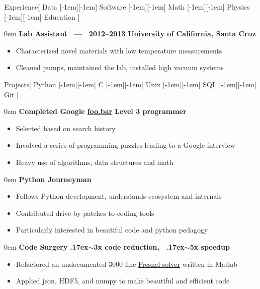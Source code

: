 \documentclass[11pt,a4paper]{article}
\newenvironment{headedsection}[2]{
    \begin{addmargin}[0.5em]{0em}
    {\large\bfseries #1} \hfill {\bfseries #2}%
    \begin{itemize}
        [label={}, topsep=0pt, itemsep=1.5pt, parsep=0pt, leftmargin=1.5em]
}{
    \end{itemize}
    \end{addmargin}
    \medskip
}
\newcommand*\sbull{%
    \raisebox{-0.550ex}[-1em][-1em]{\textscale{2}{\( \cdot \)}}\xspace
}
\newcommand{\mytilde}{\raise.17ex\hbox{$\scriptstyle\sim$}}
\begin{document}
\begin{mysection}{Experience}[
    Data \sbull{} Software \sbull{} Math \sbull{} Physics \sbull{} Education
]
    \begin{headedsection}
          {Lab Assistant \ --- \ 2012--2013}
          {University of California, Santa Cruz}

        \item Characterized novel materials with low temperature measurements
        \item Cleaned pumps, maintained the lab, installed high vacuum systems
    \end{headedsection}
\end{mysection}

\begin{mysection}{Projects}[
    Python \sbull{} C \sbull{} Unix \sbull{} SQL \sbull{} Git
]

    \begin{headedsection}
        {Completed Google 
            \href{https://news.ycombinator.com/item?id=8588080}{foo.bar}}
        {Level 3 programmer}

        \item Selected based on search history
        \item Involved a series of programming puzzles leading to a Google
            interview
        \item Heavy use of algorithms, data structures and math
    \end{headedsection}

    \begin{headedsection}{Python Journeyman}{}
        \item Follows Python development, understands ecosystem and internals
        \item Contributed drive-by patches to coding tools
        \item Particularly interested in beautiful code and python pedagogy
    \end{headedsection}

    \begin{headedsection}{Code Surgery}
          {\mytilde{}3x code reduction, \ \mytilde{}5x speedup}

        \item Refactored an undocumented 3000 line
            \href{https://en.wikipedia.org/wiki/Fresnel_equations}
                {Fresnel solver}
             written in Matlab
        \item Applied json, HDF5, and numpy to make beautiful and efficient 
            code
    \end{headedsection}
\end{mysection}
\end{document}
